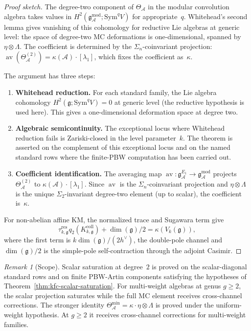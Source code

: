 \documentclass[11pt,reqno]{amsart}
\theoremstyle{definition}
\theoremstyle{remark}
\newtheorem{remark}[theorem]{Remark}
\newcommand{\cA}{\mathcal{A}}
\newcommand{\Sym}{\mathrm{Sym}}
\newcommand{\fg}{\mathfrak{g}}
\newcommand{\Eone}{E_1}
\DeclareMathOperator{\av}{av}
\numberwithin{equation}{section}
\begin{document}
\begin{proof}[Proof sketch]
The degree-two component of $\Theta_\cA$ in the modular convolution
algebra takes values in
$H^2(\fg_\cA^{\mathrm{mod}}; \Sym^q V)$ for appropriate~$q$.
Whitehead's second lemma gives vanishing of this cohomology for
reductive Lie algebras at generic level: the space of degree-two
MC deformations is one-dimensional, spanned by
$\eta \otimes \Lambda$. The coefficient is determined by the
$\Sigma_n$-coinvariant projection:
$\av(\Theta_\cA^{(2)}) = \kappa(\cA) \cdot [\lambda_1]$, which
fixes the coefficient as~$\kappa$.

The argument has three steps:
\begin{enumerate}
\item \textbf{Whitehead reduction.} For each standard family, the
  Lie algebra cohomology $H^2(\fg; \Sym^q V) = 0$ at generic level
  (the reductive hypothesis is used here). This gives a
  one-dimensional deformation space at degree two.
\item \textbf{Algebraic semicontinuity.} The exceptional locus
  where Whitehead reduction fails is Zariski-closed in the level
  parameter~$k$. The theorem is asserted on the complement of this
  exceptional locus and on the named standard rows where the
  finite-PBW computation has been carried out.
\item \textbf{Coefficient identification.} The averaging map
  $\av \colon \fg_\cA^{\Eone} \to \fg_\cA^{\mathrm{mod}}$
  projects $\Theta_\cA^{(2)}$ to
  $\kappa(\cA) \cdot [\lambda_1]$. Since $\av$ is the
  $\Sigma_n$-coinvariant projection and $\eta \otimes \Lambda$ is
  the unique $\Sigma_2$-invariant degree-two element (up to scalar),
  the coefficient is~$\kappa$.
\end{enumerate}

For non-abelian affine KM, the normalized trace and Sugawara term give
\[
\tau_{k,\fg}^{\mathrm{res}}q_2(K_{k,\fg}^{\mathrm{coll}})
+\dim(\fg)/2=\kappa(V_k(\fg)),
\]
where the first term is $k\dim(\fg)/(2h^\vee)$, the
double-pole channel and $\dim(\fg)/2$ is the simple-pole
self-contraction through the adjoint Casimir.
\end{proof}

\begin{remark}[Scope]
\label{rem:kfc-saturation-scope}
Scalar saturation at degree~$2$ is proved on the scalar-diagonal
standard rows and on finite PBW-Artin components satisfying the
hypotheses of Theorem~\ref{thm:kfc-scalar-saturation}. For
multi-weight algebras at genus $g \geq 2$, the scalar projection
saturates while the full MC element receives cross-channel
corrections. The stronger identity
$\Theta_\cA^{\mathrm{min}} = \kappa \cdot \eta \otimes \Lambda$
is proved under the uniform-weight hypothesis. At $g \geq 2$ it
receives cross-channel corrections for multi-weight families.
\end{remark}
\end{document}
